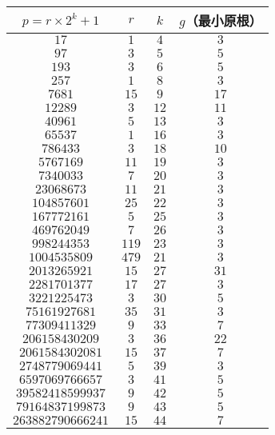 \documentclass[12pt]{ctexart}
\begin{document}
\begin{tabular}{c|c|c|c}
	$p=r\times 2^k+1$   &  $r$  & $k$  & $g$（最小原根）\\
 \hline
		  $17$          &  $1$  & $4$  &  $3$  \\
		  $97$          &  $3$  & $5$  &  $5$  \\
		  $193$         &  $3$  & $6$  &  $5$  \\
		  $257$         &  $1$  & $8$  &  $3$  \\
		 $7681$         & $15$  & $9$  & $17$  \\
		 $12289$        &  $3$  & $12$ & $11$  \\
		 $40961$        &  $5$  & $13$ &  $3$  \\
		 $65537$        &  $1$  & $16$ &  $3$  \\
		$786433$        &  $3$  & $18$ & $10$  \\
		$5767169$       & $11$  & $19$ &  $3$  \\
		$7340033$       &  $7$  & $20$ &  $3$  \\
	   $23068673$       & $11$  & $21$ &  $3$  \\
	   $104857601$      & $25$  & $22$ &  $3$  \\
	   $167772161$      &  $5$  & $25$ &  $3$  \\
	   $469762049$      &  $7$  & $26$ &  $3$  \\
	   $998244353$      & $119$ & $23$ &  $3$  \\
	  $1004535809$      & $479$ & $21$ &  $3$  \\
	  $2013265921$      & $15$  & $27$ & $31$  \\
	  $2281701377$      & $17$  & $27$ &  $3$  \\
	  $3221225473$      &  $3$  & $30$ &  $5$  \\
	  $75161927681$     & $35$  & $31$ &  $3$  \\
	  $77309411329$     &  $9$  & $33$ &  $7$  \\
	 $206158430209$     &  $3$  & $36$ & $22$  \\
	 $2061584302081$    & $15$  & $37$ &  $7$  \\
	 $2748779069441$    &  $5$  & $39$ &  $3$  \\
	 $6597069766657$    &  $3$  & $41$ &  $5$  \\
	$39582418599937$    &  $9$  & $42$ &  $5$  \\
	$79164837199873$    &  $9$  & $43$ &  $5$  \\
	$263882790666241$   & $15$  & $44$ &  $7$  \\

\end{tabular}
\end{document}
